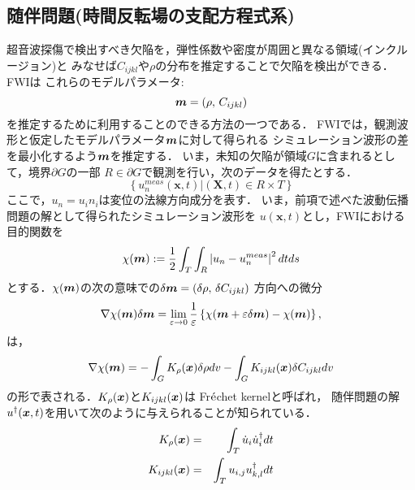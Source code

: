 \subsection{随伴問題(時間反転場の支配方程式系)}
超音波探傷で検出すべき欠陥を，弾性係数や密度が周囲と異なる領域(インクルージョン)と
みなせば$C_{ijkl}$や$\rho$の分布を推定することで欠陥を検出ができる．FWIは
これらのモデルパラメータ:
\begin{equation}
	\boldsymbol{m}=\left( \rho, \, C_{ijkl}\right)
	\label{eqn:mprms}
\end{equation}
を推定するために利用することのできる方法の一つである．
FWIでは，観測波形と仮定したモデルパラメータ$\boldsymbol{m}$に対して得られる
シミュレーション波形の差を最小化するよう$\boldsymbol{m}$を推定する．
いま，未知の欠陥が領域$G$に含まれるとして，境界$\partial G$の一部
$R\in\partial G$で観測を行い，次のデータを得たとする．
\begin{equation}
	\left\{ 
	\left. 
	u_n^{meas}(\boldsymbol{x},t)\right|  (\boldsymbol{X},t)\in R\times T
	\right\}
	\label{eqn:data}
\end{equation}
ここで，$u_n=u_in_i$は変位の法線方向成分を表す．
いま，前項で述べた波動伝播問題の解として得られたシミュレーション波形を
$u(\boldsymbol{x},t)$とし，FWIにおける目的関数を
\begin{equation}
	\chi(\boldsymbol{m}):= \frac{1}{2} \int _T\int _R \left|u_n-u_n^{meas}\right|^2 dtds
	\label{eqn:cost}
\end{equation}
とする．$\chi(\boldsymbol{m})$の次の意味での$\delta \boldsymbol{m}=(\delta \rho,\, \delta C_{ijkl})$
方向への微分
\begin{equation}
	\nabla \chi (\boldsymbol{m})\delta \boldsymbol{m} = \lim_{\varepsilon \rightarrow 0}
	\frac{1}{\varepsilon}
	\left\{
		\chi(\boldsymbol{m}+\varepsilon \delta \boldsymbol{m})
		-
		\chi(\boldsymbol{m})
	\right\}, 
	\label{eqn:del_chi}
\end{equation}
は，
\begin{equation}
	\nabla \chi(\boldsymbol{m}) = 
	-\int_G K_{\rho}(\boldsymbol{x})\delta \rho dv
	- 
	\int_G K_{ijkl}(\boldsymbol{x}) \delta C_{ijkl} dv
	\label{eqn:}
\end{equation}
の形で表される．$K_\rho(\boldsymbol{x})$と$K_{ijkl}(\boldsymbol{x})$は
Fr$\acute{\rm e}$chet kernelと呼ばれ，
随伴問題の解$u^{\dagger}(\boldsymbol{x},t)$を用いて次のように与えられることが知られている．
\begin{eqnarray}
	K_\rho(\boldsymbol{x}) &= & \int _T \dot{u}_i \dot{u}^{\dagger}_i dt 
	\label{eqn:K_rho}
	\\
	K_{ijkl}(\boldsymbol{x}) &= & \int _T u_{i,j} u^{\dagger}_{k,l} dt 
	\label{eqn:K_ijkl}
\end{eqnarray}
